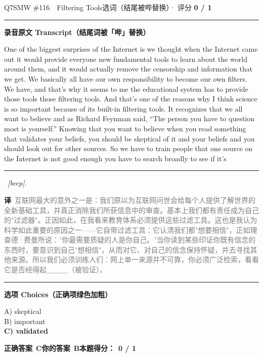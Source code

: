 \documentclass[11pt]{article}
\newcommand{\ptesub}[1]{%
  \par\needspace{2\baselineskip}\smallskip
  {\color{cAccent}\rule[-0.2ex]{3pt}{1.05em}}\hspace{6pt}%
  {\bfseries\color{cHead}#1}\par\nopagebreak\smallskip}
\newcommand{\zh}[1]{{\footnotesize\textcolor{cNote}{\textbf{译}}\ \textcolor{gray}{#1}}}
\begin{document}
\begin{qblock}{Q7\quad SMW \#116\ \ Filtering Tools}{选词（结尾被哔替换）· 评分 \textcolor{cAccent}{\bfseries 0 / 1}}
\ptesub{录音原文 Transcript（结尾词被「哔」替换）}
\begin{promptbox}
One of the biggest surprises of the Internet is we thought when the Internet came out it would provide everyone new fundamental tools to learn about the world around them, and it would actually remove the censorship and information that we get. We basically all have our own responsibility to become our own filters. We have, and that's why it seems to me the educational system has to provide those tools those filtering tools. And that's one of the reasons why I think science is so important because of its built-in filtering tools. It recognizes that we all want to believe and as Richard Feynman said, ``The person you have to question most is yourself.'' Knowing that you want to believe when you read something that validates your beliefs, you should be skeptical of it and your beliefs and you should look out for other sources. So we have to train people that one source on the Internet is not good enough you have to search broadly to see if it's \rule[0.3ex]{1.2cm}{0.4pt}\ \textit{[beep]}.
\end{promptbox}
\zh{互联网最大的意外之一是：我们原以为互联网问世会给每个人提供了解世界的全新基础工具，并真正消除我们所获信息中的审查。基本上我们都有责任成为自己的"过滤器"。正因如此，在我看来教育体系必须提供这些过滤工具。这也是我认为科学如此重要的原因之一——它自带过滤工具：它认清我们都"想要相信"，正如理查德·费曼所说："你最需要质疑的人是你自己。"当你读到某些印证你既有信念的东西时，要意识到自己"想相信"，从而对它、对自己的信念保持怀疑，并去寻找其他来源。所以我们必须训练人们：网上单一来源并不可靠，你必须广泛检索，看看它是否经得起＿＿＿（被验证）。}
\ptesub{选项 Choices（正确项绿色加粗）}
{\small
A) skeptical\\
B) important\\
{\color{cFix}\textbf{C) validated}}}
\par\smallskip
\textbf{正确答案}\ \textcolor{cFix}{\bfseries C}\qquad\textbf{你的答案}\ {\color{cWrong}\bfseries B}\qquad\textbf{本题得分：}\ {\color{cAccent}\bfseries 0 / 1}
\end{qblock}
\end{document}
